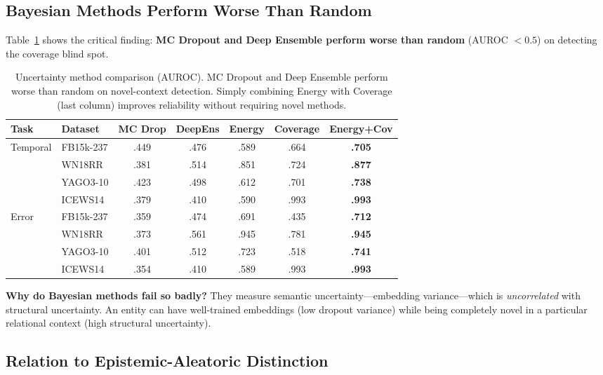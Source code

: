 \documentclass{article}
\begin{document}
\subsection{Bayesian Methods Perform Worse Than Random}

Table~\ref{tab:auroc} shows the critical finding: \textbf{MC Dropout and Deep Ensemble perform worse than random} (AUROC $< 0.5$) on detecting the coverage blind spot.

\begin{table}[htbp]
\centering
\caption{Uncertainty method comparison (AUROC). MC Dropout and Deep Ensemble perform worse than random on novel-context detection. Simply combining Energy with Coverage (last column) improves reliability without requiring novel methods.}
\label{tab:auroc}
\begin{tabular}{llccccc}
\toprule
Task & Dataset & MC Drop & DeepEns & Energy & Coverage & Energy+Cov \\
\midrule
\multirow{4}{*}{Temporal}
& FB15k-237 & .449 & .476 & .589 & .664 & \textbf{.705} \\
& WN18RR & .381 & .514 & .851 & .724 & \textbf{.877} \\
& YAGO3-10 & .423 & .498 & .612 & .701 & \textbf{.738} \\
& ICEWS14 & .379 & .410 & .590 & .993 & \textbf{.993} \\
\midrule
\multirow{4}{*}{Error}
& FB15k-237 & .359 & .474 & .691 & .435 & \textbf{.712} \\
& WN18RR & .373 & .561 & .945 & .781 & \textbf{.945} \\
& YAGO3-10 & .401 & .512 & .723 & .518 & \textbf{.741} \\
& ICEWS14 & .354 & .410 & .589 & .993 & \textbf{.993} \\
\bottomrule
\end{tabular}
\end{table}

\textbf{Why do Bayesian methods fail so badly?} They measure semantic uncertainty---embedding variance---which is \emph{uncorrelated} with structural uncertainty. An entity can have well-trained embeddings (low dropout variance) while being completely novel in a particular relational context (high structural uncertainty).

\subsection{Relation to Epistemic-Aleatoric Distinction}
\end{document}
